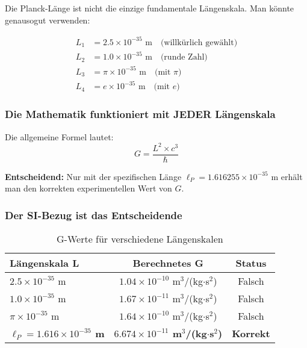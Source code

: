 \documentclass[12pt,a4paper]{article}
\theoremstyle{definition}
\begin{document}
	Die Planck-L\"ange ist nicht die einzige fundamentale L\"angenskala. Man k\"onnte genausogut verwenden:
	
	\begin{align}
		L_1 &= 2.5 \times 10^{-35} \text{ m} \quad \text{(willk\"urlich gew\"ahlt)}\\
		L_2 &= 1.0 \times 10^{-35} \text{ m} \quad \text{(runde Zahl)}\\
		L_3 &= \pi \times 10^{-35} \text{ m} \quad \text{(mit } \pi \text{)}\\
		L_4 &= e \times 10^{-35} \text{ m} \quad \text{(mit } e \text{)}
	\end{align}
	
	\subsubsection{Die Mathematik funktioniert mit JEDER L\"angenskala}
	
	Die allgemeine Formel lautet:
	\begin{equation}
		G = \frac{L^2 \times c^3}{\hbar}
	\end{equation}
	
	\textbf{Entscheidend:} Nur mit der spezifischen L\"ange $\ell_P = 1.616255 \times 10^{-35}$ m erh\"alt man den korrekten experimentellen Wert von $G$.
	
	\subsubsection{Der SI-Bezug ist das Entscheidende}
	
	\begin{table}[h]
		\centering
		\begin{tabular}{@{}lcc@{}}
			\toprule
			\textbf{L\"angenskala L} & \textbf{Berechnetes G} & \textbf{Status} \\
			\midrule
			$2.5 \times 10^{-35}$ m & $1.04 \times 10^{-10}$ m$^3$/(kg$\cdot$s$^2$) & Falsch \\
			$1.0 \times 10^{-35}$ m & $1.67 \times 10^{-11}$ m$^3$/(kg$\cdot$s$^2$) & Falsch \\
			$\pi \times 10^{-35}$ m & $1.64 \times 10^{-10}$ m$^3$/(kg$\cdot$s$^2$) & Falsch \\
			\textbf{$\ell_P = 1.616 \times 10^{-35}$ m} & \textbf{$6.674 \times 10^{-11}$ m$^3$/(kg$\cdot$s$^2$)} & \textbf{Korrekt} \\
			\bottomrule
		\end{tabular}
		\caption{G-Werte f\"ur verschiedene L\"angenskalen}
	\end{table}
	
\end{document}
